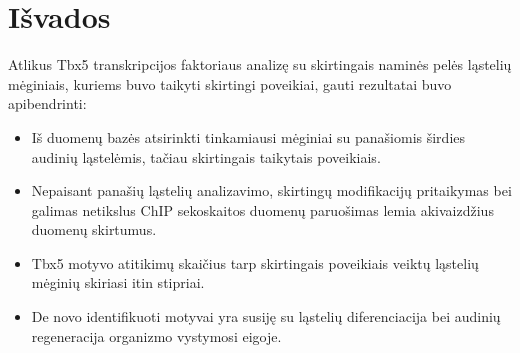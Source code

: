 \documentclass[12pt]{article}
\begin{document}
\newpage


\section{Išvados}
Atlikus Tbx5 transkripcijos faktoriaus analizę su skirtingais naminės pelės
ląstelių mėginiais, kuriems buvo taikyti skirtingi poveikiai, gauti rezultatai
buvo apibendrinti:

\begin{itemize}
    \item Iš duomenų bazės atsirinkti tinkamiausi mėginiai su panašiomis
        širdies audinių ląstelėmis, tačiau skirtingais taikytais poveikiais.
    \item Nepaisant panašių ląstelių analizavimo, skirtingų modifikacijų
        pritaikymas bei galimas netikslus ChIP sekoskaitos duomenų paruošimas
        lemia akivaizdžius duomenų skirtumus.
    \item Tbx5 motyvo atitikimų skaičius tarp skirtingais poveikiais veiktų
        ląstelių mėginių skiriasi itin stipriai.
    \item De novo identifikuoti motyvai yra susiję su ląstelių diferenciacija
        bei audinių regeneracija organizmo vystymosi eigoje.
\end{itemize}

\newpage

\end{document}

